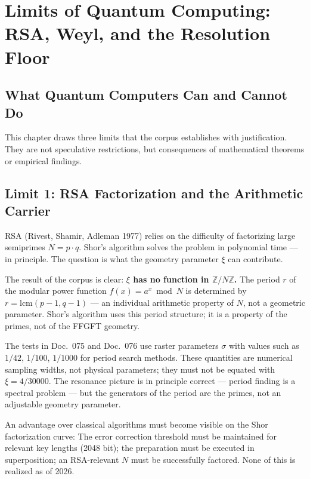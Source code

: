 \chapter{Limits of Quantum Computing: RSA, Weyl, and the Resolution Floor}
\label{ch:grenze}

\section{What Quantum Computers Can and Cannot Do}

This chapter draws three limits that the corpus establishes with justification.
They are not speculative restrictions, but
consequences of mathematical theorems or empirical findings.

\section{Limit 1: RSA Factorization and the Arithmetic Carrier}

RSA (Rivest, Shamir, Adleman 1977) relies on the difficulty of
factorizing large semiprimes $N = p\cdot q$. Shor's algorithm
solves the problem in polynomial time --- in principle. The question is what
the geometry parameter $\xi$ can contribute.

The result of the corpus is clear: \textbf{$\xi$ has no function in $\mathbb{Z}/N\mathbb{Z}$.} The period $r$ of the modular power function
$f(x) = a^x\bmod N$ is determined by $r = \mathrm{lcm}(p-1,q-1)$ ---
an individual arithmetic property of $N$, not a
geometric parameter. Shor's algorithm uses this period structure;
it is a property of the primes, not of the FFGFT geometry.

The tests in Doc.~075 and Doc.~076 use raster parameters $\sigma$
with values such as $1/42$, $1/100$, $1/1000$ for period search methods.
These quantities are numerical sampling widths, not physical
parameters; they must not be equated with $\xi = 4/30000$.
The resonance picture is in principle correct --- period finding is a
spectral problem --- but the generators of the period are the
primes, not an adjustable geometry parameter.

An advantage over classical algorithms must become visible on the
Shor factorization curve: The error correction
threshold must be maintained for relevant key lengths (2048 bit);
the preparation must be executed in superposition; an
RSA-relevant $N$ must be successfully factored. None of this
is realized as of 2026.

